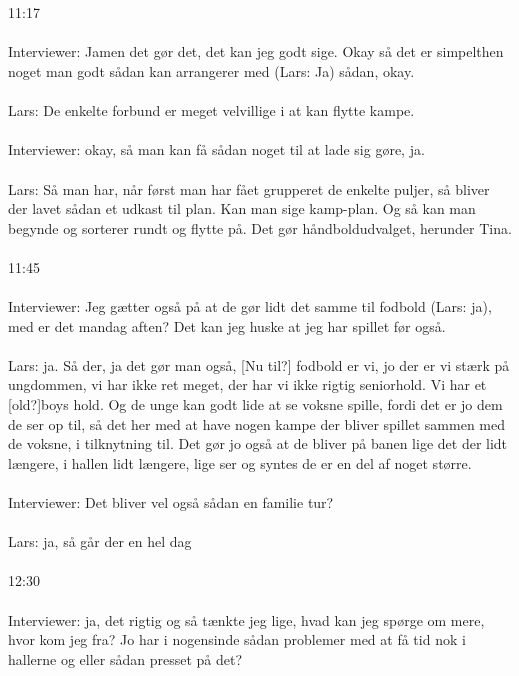 \\\\
11:17
\\\\
Interviewer: Jamen det gør det, det kan jeg godt sige. Okay så det er simpelthen noget man godt sådan kan arrangerer med (Lars: Ja) sådan, okay.
\\\\
Lars: De enkelte forbund er meget velvillige i at kan flytte kampe. 
\\\\
Interviewer:  okay, så man kan få sådan noget til at lade sig gøre, ja.
\\\\
Lars: Så man har, når først man har fået grupperet de enkelte puljer, så bliver der lavet sådan et udkast til plan. Kan man sige kamp-plan. Og så kan man begynde og sorterer rundt og flytte på. Det gør håndboldudvalget, herunder Tina.
\\\\
11:45
\\\\
Interviewer: Jeg gætter også på at de gør lidt det samme til fodbold (Lars: ja), med er det mandag aften? Det kan jeg huske at jeg har spillet før også. 
\\\\
Lars: ja. Så der, ja det gør man også, [Nu til?] fodbold er vi, jo der er vi stærk på ungdommen, vi har ikke ret meget, der har vi ikke rigtig seniorhold. Vi har et [old?]boys hold. Og de unge kan godt lide at se voksne spille, fordi det er jo dem de ser op til, så det her med at have nogen kampe der bliver spillet sammen med de voksne, i tilknytning til. Det gør jo også at de bliver på banen lige det der lidt længere, i hallen lidt længere, lige ser og syntes de er en del af noget større.
\\\\
Interviewer: Det bliver vel også sådan en familie tur? 
\\\\
Lars: ja, så går der en hel dag
\\\\
12:30
\\\\
Interviewer: ja, det rigtig og så tænkte jeg lige, hvad kan jeg spørge om mere, hvor kom jeg fra? Jo har i nogensinde sådan problemer med at få tid nok i hallerne og eller sådan presset på det?
\\\\
